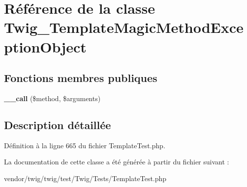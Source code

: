 \hypertarget{class_twig___template_magic_method_exception_object}{}\section{Référence de la classe Twig\+\_\+\+Template\+Magic\+Method\+Exception\+Object}
\label{class_twig___template_magic_method_exception_object}
\subsection*{Fonctions membres publiques}
\begin{DoxyCompactItemize}
\item 
{\bfseries \+\_\+\+\_\+call} (\$method, \$arguments)\hypertarget{class_twig___template_magic_method_exception_object_acfa40ec504c3c792c3b84cf2f1af511d}{}\label{class_twig___template_magic_method_exception_object_acfa40ec504c3c792c3b84cf2f1af511d}

\end{DoxyCompactItemize}


\subsection{Description détaillée}


Définition à la ligne 665 du fichier Template\+Test.\+php.



La documentation de cette classe a été générée à partir du fichier suivant \+:\begin{DoxyCompactItemize}
\item 
vendor/twig/twig/test/\+Twig/\+Tests/Template\+Test.\+php\end{DoxyCompactItemize}
